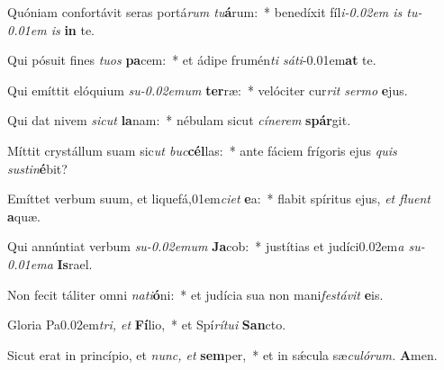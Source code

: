 \item Quóniam confortávit seras portá\textit{rum tu}\textbf{á}rum:~* benedíxit fíl\textit{i\kern -0.02em is tu\kern -0.01em is} \textbf{in} te.
\item Qui pósuit fines \textit{tuos} \textbf{pa}cem:~* et ádipe frumén\textit{ti sáti}\kern -0.01em\textbf{at} te.
\item Qui emíttit elóquium \textit{su\kern -0.02emum} \textbf{ter}ræ:~* velóciter cur\textit{rit sermo} \textbf{e}jus.
\item Qui dat nivem \textit{sicut} \textbf{la}nam:~* nébulam sicut \textit{cínerem} \textbf{spár}git.
\item Míttit crystállum suam sic\textit{ut buc}\textbf{cél}las:~* ante fáciem frígoris ejus \textit{quis sus\-tin}\textbf{é}bit?
\item Emíttet verbum suum, et liquefá,01em\textit{ciet} \textbf{e}a:~* flabit spíritus ejus, \textit{et fluent} \textbf{a}quæ.
\item Qui annúntiat verbum \textit{su\kern-0.02emum} \textbf{Ja}cob:~* justítias et judíci\kern 0.02em\textit{a su\kern -0.01ema} \textbf{Is}rael.
\item Non fecit táliter omni \textit{nati}\textbf{ó}ni:~* et judícia sua non mani\textit{festávit} \textbf{e}is.
\item Gloria Pa\kern 0.02em\textit{tri, et} \textbf{Fí}lio,~* et Spí\textit{rítui} \textbf{San}cto.
\item Sicut erat in princípio, et \textit{nunc, et} \textbf{sem}per,~* et in sǽcula sæ\tinyhspace\textit{culórum.} \textbf{A}men.
